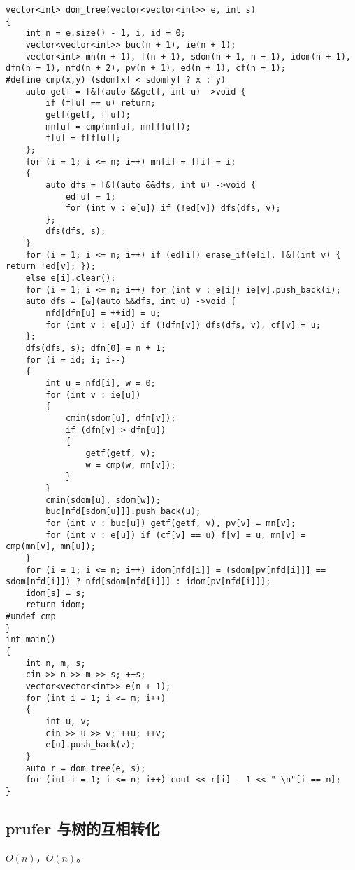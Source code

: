 \documentclass[12pt]{ctexart}
\begin{document}
\begin{lstlisting}
vector<int> dom_tree(vector<vector<int>> e, int s)
{
	int n = e.size() - 1, i, id = 0;
	vector<vector<int>> buc(n + 1), ie(n + 1);
	vector<int> mn(n + 1), f(n + 1), sdom(n + 1, n + 1), idom(n + 1), dfn(n + 1), nfd(n + 2), pv(n + 1), ed(n + 1), cf(n + 1);
#define cmp(x,y) (sdom[x] < sdom[y] ? x : y)
	auto getf = [&](auto &&getf, int u) ->void {
		if (f[u] == u) return;
		getf(getf, f[u]);
		mn[u] = cmp(mn[u], mn[f[u]]);
		f[u] = f[f[u]];
	};
	for (i = 1; i <= n; i++) mn[i] = f[i] = i;
	{
		auto dfs = [&](auto &&dfs, int u) ->void {
			ed[u] = 1;
			for (int v : e[u]) if (!ed[v]) dfs(dfs, v);
		};
		dfs(dfs, s);
	}
	for (i = 1; i <= n; i++) if (ed[i]) erase_if(e[i], [&](int v) { return !ed[v]; });
	else e[i].clear();
	for (i = 1; i <= n; i++) for (int v : e[i]) ie[v].push_back(i);
	auto dfs = [&](auto &&dfs, int u) ->void {
		nfd[dfn[u] = ++id] = u;
		for (int v : e[u]) if (!dfn[v]) dfs(dfs, v), cf[v] = u;
	};
	dfs(dfs, s); dfn[0] = n + 1;
	for (i = id; i; i--)
	{
		int u = nfd[i], w = 0;
		for (int v : ie[u])
		{
			cmin(sdom[u], dfn[v]);
			if (dfn[v] > dfn[u])
			{
				getf(getf, v);
				w = cmp(w, mn[v]);
			}
		}
		cmin(sdom[u], sdom[w]);
		buc[nfd[sdom[u]]].push_back(u);
		for (int v : buc[u]) getf(getf, v), pv[v] = mn[v];
		for (int v : e[u]) if (cf[v] == u) f[v] = u, mn[v] = cmp(mn[v], mn[u]);
	}
	for (i = 1; i <= n; i++) idom[nfd[i]] = (sdom[pv[nfd[i]]] == sdom[nfd[i]]) ? nfd[sdom[nfd[i]]] : idom[pv[nfd[i]]];
	idom[s] = s;
	return idom;
#undef cmp
}
int main()
{
	int n, m, s;
	cin >> n >> m >> s; ++s;
	vector<vector<int>> e(n + 1);
	for (int i = 1; i <= m; i++)
	{
		int u, v;
		cin >> u >> v; ++u; ++v;
		e[u].push_back(v);
	}
	auto r = dom_tree(e, s);
	for (int i = 1; i <= n; i++) cout << r[i] - 1 << " \n"[i == n];
}

\end{lstlisting}

\subsection{prufer 与树的互相转化}

$O(n)$，$O(n)$。
\end{document}
